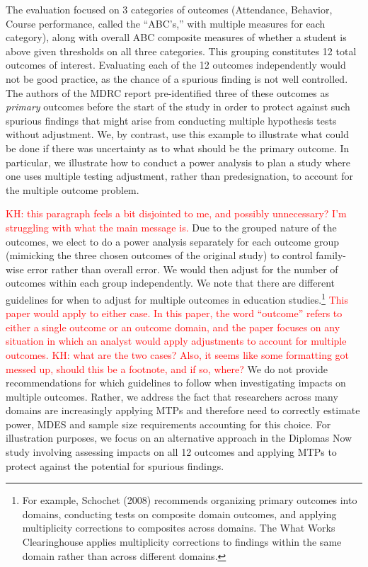 \documentclass[
]{article}
\begin{document}
The evaluation focused on 3 categories of outcomes (Attendance,
Behavior, Course performance, called the ``ABC's,'' with multiple
measures for each category), along with overall ABC composite measures
of whether a student is above given thresholds on all three categories.
This grouping constitutes 12 total outcomes of interest. Evaluating each
of the 12 outcomes independently would not be good practice, as the
chance of a spurious finding is not well controlled. The authors of the
MDRC report pre-identified three of these outcomes as \emph{primary}
outcomes before the start of the study in order to protect against such
spurious findings that might arise from conducting multiple hypothesis
tests without adjustment. We, by contrast, use this example to
illustrate what could be done if there was uncertainty as to what should
be the primary outcome. In particular, we illustrate how to conduct a
power analysis to plan a study where one uses multiple testing
adjustment, rather than predesignation, to account for the multiple
outcome problem.

\textcolor{red}{KH: this paragraph feels a bit disjointed to me, and possibly unnecessary? I'm struggling with what the main message is.}
Due to the grouped nature of the outcomes, we elect to do a power
analysis separately for each outcome group (mimicking the three chosen
outcomes of the original study) to control family-wise error rather than
overall error. We would then adjust for the number of outcomes within
each group independently. We note that there are different guidelines
for when to adjust for multiple outcomes in education
studies.\footnote{For example, Schochet (2008) recommends organizing primary outcomes into domains, conducting tests on composite domain outcomes, and applying multiplicity corrections to composites across domains. The What Works Clearinghouse applies multiplicity corrections to findings within the same domain rather than across different domains.}
\textcolor{red}{This paper would apply to either case.
In this paper, the word “outcome” refers to either a single outcome or an outcome domain, and the paper focuses on any situation in which an analyst would apply adjustments to account for multiple outcomes. KH: what are the two cases? Also, it seems like some formatting got messed up, should this be a footnote, and if so, where?}
We do not provide recommendations for which guidelines to follow when
investigating impacts on multiple outcomes. Rather, we address the fact
that researchers across many domains are increasingly applying MTPs and
therefore need to correctly estimate power, MDES and sample size
requirements accounting for this choice. For illustration purposes, we
focus on an alternative approach in the Diplomas Now study involving
assessing impacts on all 12 outcomes and applying MTPs to protect
against the potential for spurious findings.
\end{document}
